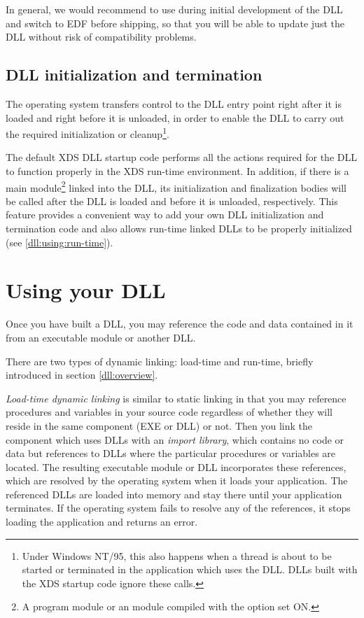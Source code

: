 In general, we would recommend to use  during initial development
of the DLL and switch to EDF before shipping, so that you will be able to
update just the DLL without risk of compatibility problems.

\subsection{DLL initialization and termination}
\label{dll:create:initterm}

The operating system transfers control to the DLL entry point right after
it is loaded and right before it is unloaded, in order to enable the DLL to carry out
the required initialization or cleanup\footnote{Under Windows NT/95, this also happens
when a thread is about to be started or terminated in the application which uses the DLL.
DLLs built with the XDS startup code ignore these calls.}.

The default XDS DLL startup code performs all the actions required for the DLL
to function properly in the XDS run-time environment.
In addition, if there is a main module\footnote{A \mt{} program module or an \ot{} module
compiled with the  option set ON.} linked into the DLL,
its initialization and finalization bodies will be
called after the DLL is loaded and before it is unloaded, respectively.
This feature provides a convenient way to add your own DLL initialization and
termination code and also allows run-time linked DLLs to be properly initialized
(see \ref{dll:using:run-time}).

\section{Using your DLL}
\label{dll:using}

Once you have built a DLL, you may reference the code and data contained in it
from an executable module or another DLL.

There are two types of dynamic linking: load-time and run-time, briefly
introduced in section \ref{dll:overview}.

{\em Load-time dynamic linking} is similar to static linking in that
you may reference procedures and variables in your source code regardless
of whether they will reside in the same component (EXE or DLL) or not.
Then you link the component which uses DLLs with an {\em import library},
which contains no code or data but references to DLLs where the particular
procedures or variables are located.
The resulting executable module or DLL incorporates these references,
which are resolved by the operating system when it loads your application.
The referenced DLLs are loaded into memory and stay there until your
application terminates.
If the operating system fails to resolve any of the references, it
stops loading the application and returns an error.

